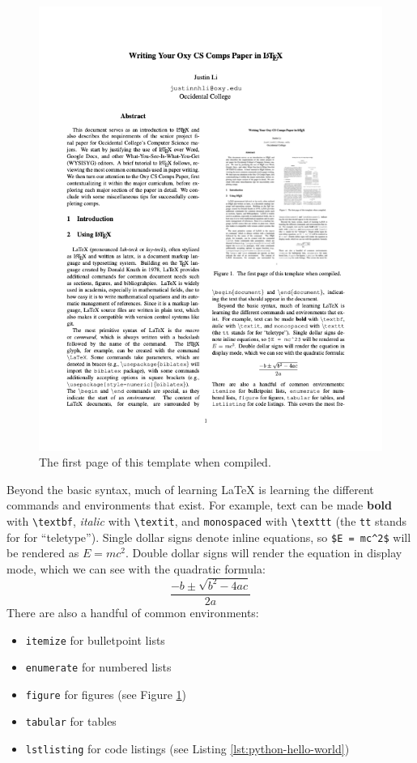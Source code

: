 \documentclass[10pt,twocolumn]{article}
\begin{document}
\begin{figure}
    \centering
    \includegraphics[width=.95\linewidth]{first-page.png}
    \caption{
        The first page of this template when compiled.
    }
    \label{fig:first-page}
\end{figure}

Beyond the basic syntax, much of learning LaTeX is learning the different commands and environments that exist.
For example, text can be made \textbf{bold} with \texttt{\textbackslash textbf}, \textit{italic} with \texttt{\textbackslash textit}, and \texttt{monospaced} with \texttt{\textbackslash texttt} (the \texttt{tt} stands for for ``teletype'').
Single dollar signs denote inline equations, so \texttt{\$E = mc\textasciicircum 2\$} will be rendered as $E = mc^2$.
Double dollar signs will render the equation in display mode, which we can see with the quadratic formula:
$$\frac{{-b \pm \sqrt {b^2 - 4ac} }}{{2a}}$$
There are also a handful of common environments:

\begin{itemize}
    \item \texttt{itemize} for bulletpoint lists
    \item \texttt{enumerate} for numbered lists
    \item \texttt{figure} for figures (see Figure \ref{fig:first-page})
    \item \texttt{tabular} for tables
    \item \texttt{lstlisting} for code listings (see Listing \ref{lst:python-hello-world})
\end{itemize}
\end{document}
